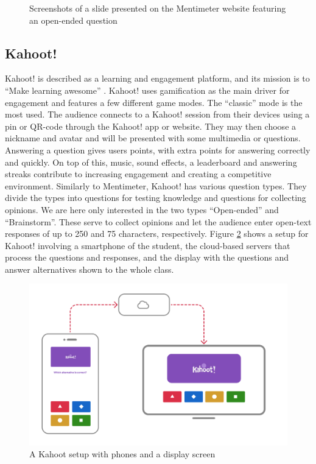 \begin{figure}[h!]
\caption{Screenshots of a slide presented on the Mentimeter website featuring an open-ended question}
\label{fig:mentimeterscreenshots}
\end{figure}

\subsection{Kahoot!}
Kahoot! is described as a learning and engagement platform, and its mission is to ``Make learning awesome'' \cite{kahootAboutKahoot}. Kahoot! uses gamification as the main driver for engagement and features a few different game modes. The ``classic'' mode is the most used. The audience connects to a Kahoot! session from their devices using a pin or QR-code through the Kahoot! app or website. They may then choose a nickname and avatar and will be presented with some multimedia or questions. Answering a question gives users points, with extra points for answering correctly and quickly. On top of this, music, sound effects, a leaderboard and answering streaks contribute to increasing engagement and creating a competitive environment. Similarly to Mentimeter, Kahoot! has various question types. They divide the types into questions for testing knowledge and questions for collecting opinions. We are here only interested in the two types ``Open-ended'' and ``Brainstorm''. These serve to collect opinions and let the audience enter open-text responses of up to 250 and 75 characters, respectively. Figure \ref{fig:kahootsetup} shows a setup for Kahoot! involving a smartphone of the student, the cloud-based servers that process the questions and responses, and the display with the questions and answer alternatives shown to the whole class.

\begin{figure}[h!]
    \centering
    \includegraphics[width=.8\linewidth]{figures/kahoot-illustration.png}
    \caption{A Kahoot setup with phones and a display screen}
    \label{fig:kahootsetup}
\end{figure}

